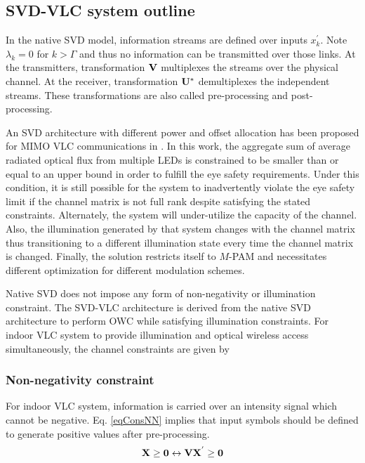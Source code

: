 \subsection{SVD-VLC system outline}
\label{subsec:svdvlcSystem}
In the native SVD model, information streams are defined over inputs $x^{'}_{k}$. Note $\lambda_{k}=0$ for $k>\Gamma$ and thus no information can be transmitted over those links. At the transmitters, transformation $\bf{V}$ multiplexes the streams over the physical channel. At the receiver,  transformation $\bf{U}^{*}$ demultiplexes the independent streams. These transformations are also called pre-processing and post-processing.

An SVD architecture with different power and offset allocation has been proposed for MIMO VLC communications in \cite{par11a}. In this work, the aggregate sum of average radiated optical flux from multiple LEDs is constrained to be smaller than or equal to an upper bound in order to fulfill the eye safety requirements. Under this condition, it is still possible for the system to inadvertently violate the eye safety limit if the channel matrix is not full rank despite satisfying the stated constraints. Alternately, the system will under-utilize the capacity of the channel. Also, the illumination generated by that system changes with the channel matrix thus transitioning to a different illumination state every time the channel matrix is changed. Finally, the solution restricts itself to $M$-PAM and necessitates different optimization for different modulation schemes.

Native SVD does not impose any form of non-negativity or illumination constraint. The SVD-VLC architecture is derived from the native SVD architecture to perform OWC while satisfying illumination constraints. For indoor VLC system to provide illumination and optical wireless access simultaneously, the channel constraints are given by

\subsubsection{Non-negativity constraint}
\label{subsubsec:svdvlcSystemNonnegative}

For indoor VLC system, information is carried over an intensity signal which cannot be negative. Eq. \eqref{eqConsNN} implies that input symbols should be defined to generate positive values after pre-processing.
\begin{equation}
	\label{eqConsNN}
	{\bf{X}} \geq {\bf{0}} \leftrightarrow {\bf{V}}{\bf{X}}^{'} \geq {\bf{0}}\\
\end{equation}
	
